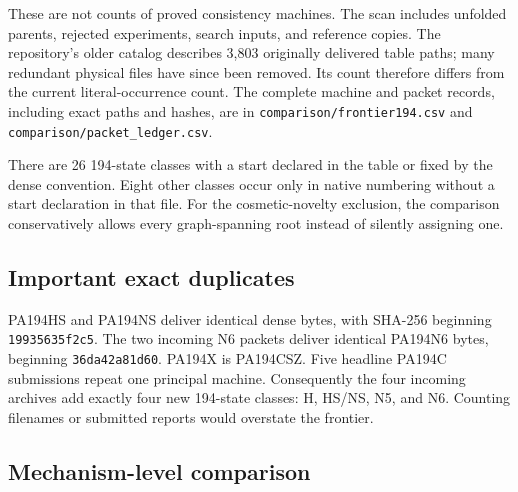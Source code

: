 \documentclass[10pt,letterpaper]{article}
\newcommand{\file}[1]{\nolinkurl{#1}}
\begin{document}
These are not counts of proved consistency machines. The scan includes
unfolded parents, rejected experiments, search inputs, and reference copies.
The repository's older catalog describes 3,803 originally delivered table
paths; many redundant physical files have since been removed. Its count
therefore differs from the current literal-occurrence count. The complete
machine and packet records, including exact paths and hashes, are in
\file{comparison/frontier194.csv} and \file{comparison/packet_ledger.csv}.

There are 26 194-state classes with a start declared in the table or fixed by
the dense convention. Eight other classes occur only in native numbering
without a start declaration in that file. For the cosmetic-novelty exclusion,
the comparison conservatively allows every graph-spanning root instead of
silently assigning one.

\subsection{Important exact duplicates}

PA194HS and PA194NS deliver identical dense bytes, with SHA-256 beginning
\texttt{19935635f2c5}. The two incoming N6 packets deliver identical PA194N6
bytes, beginning \texttt{36da42a81d60}. PA194X is PA194CSZ. Five headline
PA194C submissions repeat one principal machine. Consequently the four
incoming archives add exactly four new 194-state classes: H, HS/NS, N5,
and N6. Counting filenames or submitted reports would overstate the frontier.

\subsection{Mechanism-level comparison}
\end{document}
